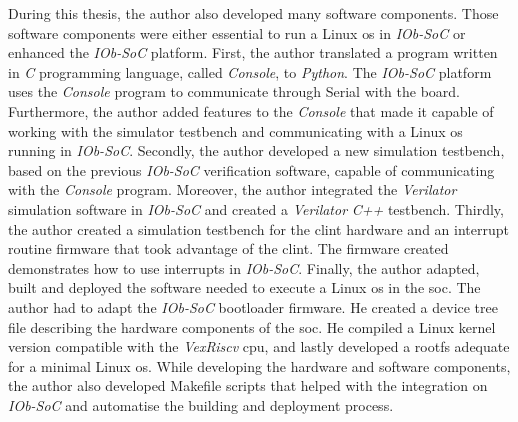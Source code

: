 During this thesis, the author also developed many software components. Those software components were either essential to run a Linux \acrshort{os} in \textit{IOb-SoC} or enhanced the \textit{IOb-SoC} platform. First, the author translated a program written in \textit{C} programming language, called \textit{Console}, to \textit{Python}. The \textit{IOb-SoC} platform uses the \textit{Console} program to communicate through Serial with the board. Furthermore, the author added features to the \textit{Console} that made it capable of working with the simulator testbench and communicating with a Linux \acrshort{os} running in \textit{IOb-SoC}. Secondly, the author developed a new simulation testbench, based on the previous \textit{IOb-SoC} verification software, capable of communicating with the \textit{Console} program. Moreover, the author integrated the \textit{Verilator}~\cite{snyder2010verilator} simulation software in \textit{IOb-SoC} and created a \textit{Verilator} \textit{C++} testbench. Thirdly, the author created a simulation testbench for the \acrshort{clint} hardware and an interrupt routine firmware that took advantage of the \acrshort{clint}. The firmware created demonstrates how to use interrupts in \textit{IOb-SoC}. Finally, the author adapted, built and deployed the software needed to execute a Linux \acrshort{os} in the \acrshort{soc}. The author had to adapt the \textit{IOb-SoC} bootloader firmware. He created a device tree file describing the hardware components of the \acrshort{soc}. He compiled a Linux kernel version compatible with the \textit{VexRiscv} \acrshort{cpu}, and lastly developed a \acrshort{rootfs} adequate for a minimal Linux \acrshort{os}. While developing the hardware and software components, the author also developed Makefile scripts that helped with the integration on \textit{IOb-SoC} and automatise the building and deployment process.


